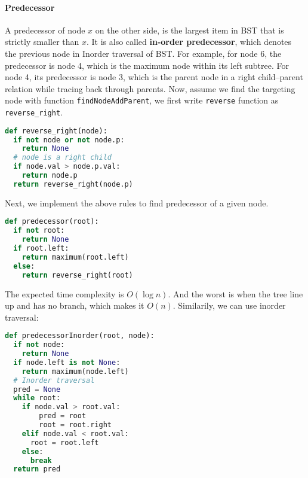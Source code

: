 \documentclass[main.tex]{subfiles}
\begin{document}
\paragraph{Predecessor}  A predecessor of node $x$ on the other side, is the largest item in BST that is strictly smaller than $x$. It is also called \textbf{in-order predecessor}, which denotes the previous node in Inorder traversal of BST. For example, for node 6, the predecessor is node 4, which is the maximum node within its left subtree. For node 4, its predecessor is node 3, which is the parent node in a right child--parent relation while tracing back through parents. Now, assume we find the targeting node with function \texttt{findNodeAddParent}, we first write \texttt{reverse} function as \texttt{reverse\_right}. 
\begin{lstlisting}[language=Python]
def reverse_right(node):
  if not node or not node.p:
    return None
  # node is a right child
  if node.val > node.p.val:
    return node.p
  return reverse_right(node.p)
\end{lstlisting}
Next, we implement the above rules to find predecessor of a given node. 
\begin{lstlisting}[language = Python]
def predecessor(root):
  if not root:
    return None
  if root.left:
    return maximum(root.left)
  else:
    return reverse_right(root) 
\end{lstlisting}
 The expected time complexity is $O(\log n)$. And the worst is when the tree line up and has no branch, which makes it $O(n)$. 
 Similarily, we can use inorder traversal:
\begin{lstlisting}[language=Python]
def predecessorInorder(root, node):
  if not node:
    return None
  if node.left is not None:
    return maximum(node.left)
  # Inorder traversal
  pred = None
  while root:      
    if node.val > root.val:
        pred = root
        root = root.right
    elif node.val < root.val:
      root = root.left
    else:
      break
  return pred
\end{lstlisting}
\end{document}
